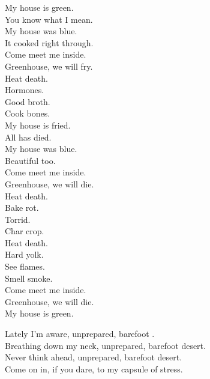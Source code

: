 My house is green. \\
You know what I mean. \\
My house was blue. \\
It cooked right through. \\

Come meet me inside. \\
Greenhouse, we will fry. \\

Heat death. \\
Hormones. \\
Good broth. \\
Cook bones. \\

My house is fried. \\
All  has died. \\
My house was blue. \\
Beautiful too. \\

Come meet me inside. \\
Greenhouse, we will die. \\

Heat death. \\
Bake rot. \\
Torrid. \\
Char crop. \\
Heat death. \\
Hard yolk. \\
See flames. \\
Smell smoke. \\

Come meet me inside. \\
Greenhouse, we will die. \\

My house is green. \\





Lately I'm aware, unprepared, barefoot . \\
Breathing down my neck, unprepared, barefoot desert. \\
Never think ahead, unprepared, barefoot desert. \\
Come on in, if you dare, to my capsule of stress. \\

